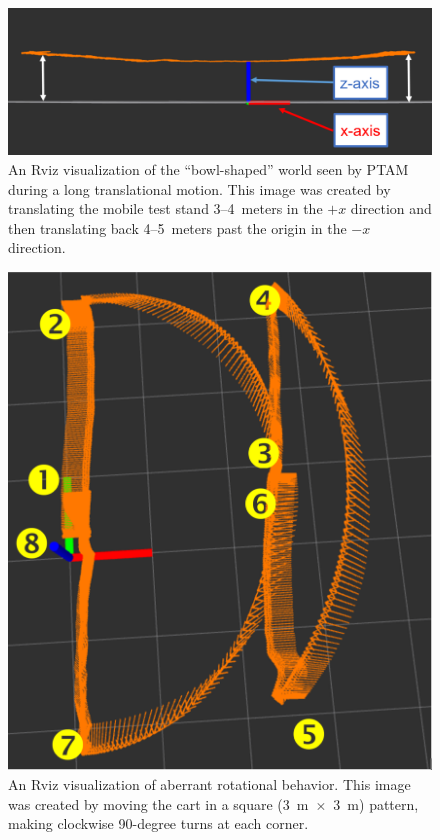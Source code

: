 \begin{figure}
  \centering
    \includegraphics[width=\textwidth]{bowl-shaped_world}
  \caption[Rviz Visualization of Translational (Lens) Distortion]{An Rviz visualization of the ``bowl-shaped'' world seen by PTAM during a long translational motion. This image was created by translating the mobile test stand 3--4~meters in the $+x$ direction and then translating back 4--5~meters past the origin in the $-x$ direction.}
  \label{fig:bowl-shaped_world}
\end{figure}

\begin{figure}
  \centering
    \includegraphics[height=0.8\textwidth]{rot_bug_rviz}
  \caption[Rviz Visualization of Rotational Distortion]{An Rviz visualization of aberrant rotational behavior. This image was created by moving the cart in a square (3~m~$\times$~3~m) pattern, making clockwise 90-degree turns at each corner.}
  \label{fig:rot_bug_rviz}
\end{figure}
